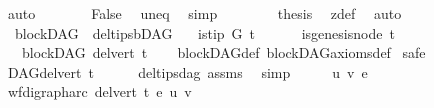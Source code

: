 \begin{isabellebody}
\ auto\isanewline
\ \ \ \ \isamarkupfalse%
\ \isamarkupfalse%
\ False\ \isamarkupfalse%
\ uneq\ \isamarkupfalse%
\ simp\isanewline
\ \ \isamarkupfalse%
\isanewline
\ \ \isamarkupfalse%
\ \isamarkupfalse%
\ {\isachardoublequoteopen}{\isacharquery}{\kern0pt}thesis{\isachardoublequoteclose}\ \isamarkupfalse%
\ z{\isacharunderscore}{\kern0pt}def\ \isamarkupfalse%
\ auto\isanewline
{}\isamarkupfalse%
%
\endisatagproof
{\isafoldproof}%
%
\isadelimproof
\isanewline
%
\endisadelimproof
\isanewline
{}\isamarkupfalse%
\ {\isacharparenleft}{\kern0pt}\ blockDAG{\isacharparenright}{\kern0pt}\ \ del{\isacharunderscore}{\kern0pt}tips{\isacharunderscore}{\kern0pt}bDAG{\isacharcolon}{\kern0pt}\isanewline
\ \ \ {\isachardoublequoteopen}is{\isacharunderscore}{\kern0pt}tip\ G\ t{\isachardoublequoteclose}\isanewline
\ \ \ \ \ {\isachardoublequoteopen}\ {\isasymnot}is{\isacharunderscore}{\kern0pt}genesis{\isacharunderscore}{\kern0pt}node\ t{\isachardoublequoteclose}\isanewline
\ \ \ {\isachardoublequoteopen}blockDAG\ {\isacharparenleft}{\kern0pt}del{\isacharunderscore}{\kern0pt}vert\ t{\isacharparenright}{\kern0pt}{\isachardoublequoteclose}\isanewline
%
\isadelimproof
\ \ %
\endisadelimproof
%
\isatagproof
{}\isamarkupfalse%
\ blockDAG{\isacharunderscore}{\kern0pt}def\ blockDAG{\isacharunderscore}{\kern0pt}axioms{\isacharunderscore}{\kern0pt}def\isanewline
{}\isamarkupfalse%
\ safe\isanewline
\ \ \isamarkupfalse%
\ {\isachardoublequoteopen}DAG{\isacharparenleft}{\kern0pt}del{\isacharunderscore}{\kern0pt}vert\ t{\isacharparenright}{\kern0pt}{\isachardoublequoteclose}\isanewline
\ \ \ \ \isamarkupfalse%
\ del{\isacharunderscore}{\kern0pt}tips{\isacharunderscore}{\kern0pt}dag\ assms\ \isamarkupfalse%
\ simp\isanewline
{}\isamarkupfalse%
\ \isanewline
\ \ \isamarkupfalse%
\ u\ v\ e\ \isanewline
\ \ \isamarkupfalse%
\ {\isachardoublequoteopen}wf{\isacharunderscore}{\kern0pt}digraph{\isachardot}{\kern0pt}arc\ {\isacharparenleft}{\kern0pt}del{\isacharunderscore}{\kern0pt}vert\ t{\isacharparenright}{\kern0pt}\ e\ {\isacharparenleft}{\kern0pt}u{\isacharcomma}{\kern0pt}\ v{\isacharparenright}{\kern0pt}{\isachardoublequoteclose}\isanewline
\ \ \isamarkupfalse%
\ \isamarkupfalse%

\end{isabellebody}
